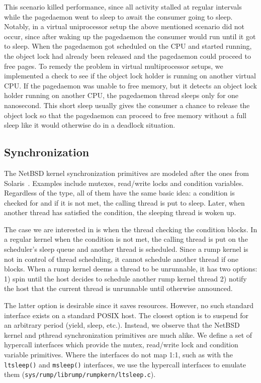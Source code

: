 This scenario killed performance, since all activity stalled at
regular intervals while the pagedaemon went to sleep to await the
consumer going to sleep.  Notably, in a virtual uniprocessor setup
the above mentioned scenario did not occur, since after waking up
the pagedaemon the consumer would run until it got to sleep.  When
the pagedaemon got scheduled on the CPU and started running, the
object lock had already been released and the pagedaemon could
proceed to free pages.  To remedy the problem in virtual multiprocessor
setups, we implemented a check to see if the object lock holder is
running on another virtual CPU.  If the pagedaemon was unable to
free memory, but it detects an object lock holder running on another
CPU, the pagedaemon thread sleeps only for one nanosecond.  This
short sleep usually gives the consumer a chance to release the object
lock so that the pagedaemon can proceed to free memory without a full
sleep like it would otherwise do in a deadlock situation.

\subsection{Synchronization}

The NetBSD kernel synchronization primitives are modeled after
the ones from Solaris~\cite{solarisinternals}.  Examples
include mutexes, read/write locks and condition variables.  Regardless
of the type, all of them have the same basic idea: a condition is
checked for and if it is not met, the calling thread is put to
sleep.  Later, when another thread has satisfied the condition,
the sleeping thread is woken up.

The case we are interested in is when the thread checking the condition
blocks.  In a regular kernel when the condition is not met, the calling
thread is put on the scheduler's sleep queue and another thread is
scheduled.  Since a rump kernel is not in control of thread scheduling,
it cannot schedule another thread if one blocks.  When a rump kernel
deems a thread to be unrunnable, it has two options: 1) spin until the
host decides to schedule another rump kernel thread 2) notify the host
that the current thread is unrunnable until otherwise announced.

The latter option is desirable since it saves resources.  However,
no such standard interface exists on a standard POSIX host.  The
closest option is to suspend for an arbitrary period (yield, sleep,
etc.).  Instead, we observe that the NetBSD kernel and pthread
synchronization primitives are much alike.  We define a set of
hypercall interfaces which provide the mutex, read/write lock and
condition variable primitives.  Where the interfaces do not map
1:1, such as with the \texttt{ltsleep()} and \texttt{msleep()}
interfaces, we use the hypercall interfaces to emulate them
(\verb+sys/rump/librump/rumpkern/ltsleep.c+).

